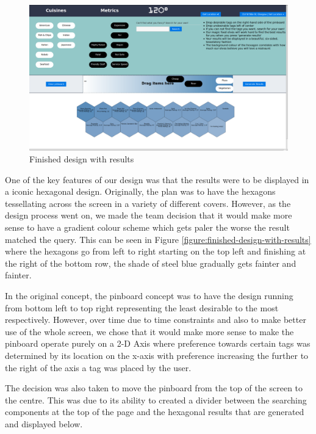 \documentclass[10pt,a4paper]{article}
\begin{document}
\begin{figure}[H]
	\begin{center}
		\includegraphics[scale=0.2]{newScreenshotWithResults.png}
		\caption{Finished design with results}
		\label{figure:finished-design-results}
	\end{center}
\end{figure}

One of the key features of our design was that the results were to be displayed in a iconic hexagonal design. Originally, the plan was to have the hexagons tessellating across the screen in a variety of different covers. However, as the design process went on, we made the team decision that it would make more sense to have a gradient colour scheme which gets paler the worse the result matched the query. This can be seen in Figure \ref{figure:finished-design-with-results} where the hexagons go from left to right starting on the top left and finishing at the right of the bottom row, the shade of steel blue gradually gets fainter and fainter.

In the original concept, the pinboard concept was to have the design running from bottom left to top right representing the least desirable to the most respectively. However, over time due to time constraints and also to make better use of the whole screen, we chose that it would make more sense to make the pinboard operate purely on a 2-D Axis where preference towards certain tags was determined by its location on the x-axis with preference increasing the further to the right of the axis a tag was placed by the user.

The decision was also taken to move the pinboard from the top of the screen to the centre. This was due to its ability to created a divider between the searching components at the top of the page and the hexagonal results that are generated and displayed below.
\end{document}
